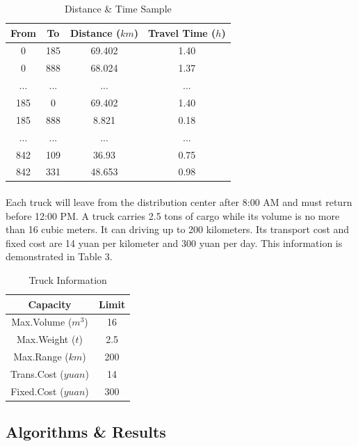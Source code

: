 \documentclass[12pt]{article}
\numberwithin{equation}{section}
\begin{document}
	\begin{table}[htbp]
  	\centering
  	\caption{Distance \& Time Sample}
    	\begin{tabular}{cccc}
    	\hline
    	From  & To    & Distance ($km$) & Travel Time ($h$) \\
    	\hline
    	0   & 185   & 69.402  & 1.40 \\
    	0   & 888   & 68.024 & 1.37 \\
    	...   & ...   & ... & ... \\
    	185   & 0   & 69.402 & 1.40 \\
    	185   & 888   & 8.821 & 0.18 \\
    	...   & ...   & ... & ... \\
    	842 & 109 & 36.93 & 0.75 \\
	842 & 331 & 48.653 & 0.98 \\
    	\hline
    	\end{tabular}
	\end{table}

	\paragraph{}Each truck will leave from the distribution center after 8:00 AM and must return before 12:00 PM. A truck carries 2.5 tons of cargo while its volume is no more than 16 cubic meters. It can driving up to 200 kilometers. Its transport cost and fixed cost are 14 yuan per kilometer and 300 yuan per day. This information is demonstrated in Table 3.

	\begin{table}[htbp]
  	\centering
  	\caption{Truck Information}
    	\begin{tabular}{cc}
    	\hline
	Capacity & Limit\\
	\hline
 	Max.Volume ($m^3$) & 16 \\
	Max.Weight ($t$) & 2.5 \\
	Max.Range ($km$) & 200 \\
	Trans.Cost ($yuan$) & 14 \\
	Fixed.Cost ($yuan$) & 300 \\
	\hline
    	\end{tabular}
	\end{table}

	\subsection{Algorithms \& Results}
	
\end{document}
